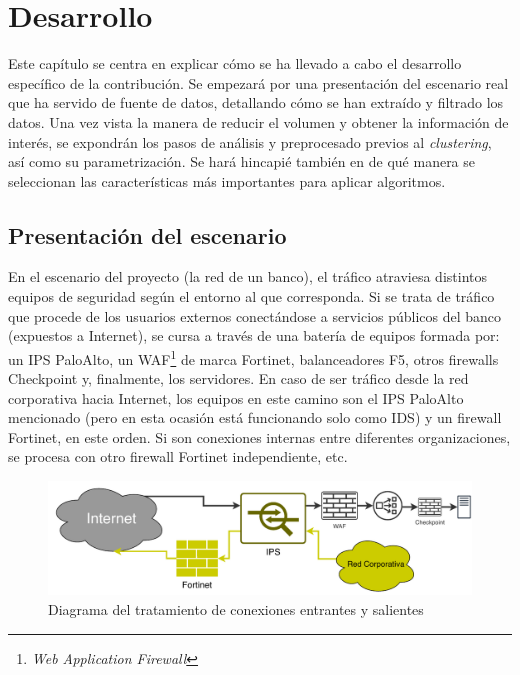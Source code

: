 \chapter{Desarrollo}\label{chap:desarrollo}

Este capítulo se centra en explicar cómo se ha llevado a cabo el desarrollo específico de la contribución.
Se empezará por una presentación del escenario real que ha servido de fuente de datos, detallando cómo se han extraído y filtrado los datos.
Una vez vista la manera de reducir el volumen y obtener la información de interés, se expondrán los pasos de análisis y preprocesado previos al \emph{clustering}, así como su parametrización.
Se hará hincapié también en de qué manera se seleccionan las características más importantes para aplicar algoritmos.

\section{Presentación del escenario}\label{sec:presentaciondelescenario}

En el escenario del proyecto (la red de un banco), el tráfico atraviesa distintos equipos de seguridad según el entorno al que corresponda.
Si se trata de tráfico que procede de los usuarios externos conectándose a servicios públicos del banco (expuestos a Internet), se cursa a través de una batería de equipos formada por:
un IPS PaloAlto, un WAF\footnote{\emph{Web Application Firewall}} de marca Fortinet, balanceadores F5, otros firewalls Checkpoint y, finalmente, los servidores.
En caso de ser tráfico desde la red corporativa hacia Internet, los equipos en este camino son el IPS PaloAlto mencionado (pero en esta ocasión está funcionando solo como IDS) y un firewall Fortinet, en este orden.
Si son conexiones internas entre diferentes organizaciones, se procesa con otro firewall Fortinet independiente, etc.

\begin{figure}[h]
    \centering
    \captionsetup{width=12cm}
    \includegraphics[width=12cm]{contenido/fig/diagrama_red.pdf}
    \caption{Diagrama del tratamiento de conexiones entrantes y salientes}
    \label{fig:diagramared}
\end{figure}

